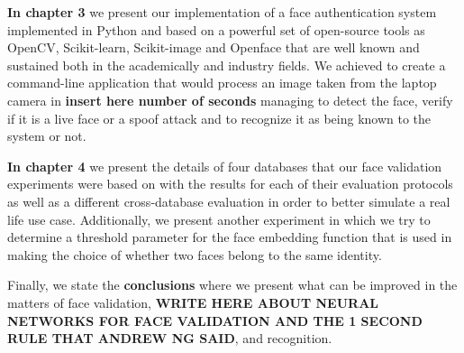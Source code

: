 \textbf{In chapter 3} we present our implementation of a face authentication system implemented in Python and based on a powerful set of open-source tools as OpenCV\cite{opencv_library}, Scikit-learn\cite{scikit-learn}, Scikit-image\cite{scikit-image} and Openface\cite{amos2016openface} that are well known and sustained both in the academically and industry fields. We achieved to create a command-line application that would process an image taken from the laptop camera in \textbf{insert here number of seconds} managing to detect the face, verify if it is a live face or a spoof attack and to recognize it as being known to the system or not.

\textbf{In chapter 4} we present the details of four databases that our face validation experiments were based on with the results for each of their evaluation protocols as well as a different cross-database evaluation in order to better simulate a real life use case. Additionally, we present another experiment in which we try to determine a threshold parameter for the face embedding function that is used in making the choice of whether two faces belong to the same identity.

Finally, we state the \textbf{conclusions} where we present what can be improved in the matters of face validation, \textbf{WRITE HERE ABOUT NEURAL NETWORKS FOR FACE VALIDATION AND THE 1 SECOND RULE THAT ANDREW NG SAID}, and recognition.
